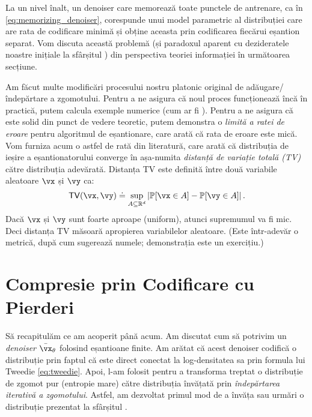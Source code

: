 \documentclass[../../book-main_ro.tex]{subfiles}
\begin{document}
\begin{remark}
	La un nivel înalt, un denoiser care memorează toate punctele de antrenare, ca în \eqref{eq:memorizing_denoiser}, corespunde unui model parametric al distribuției care are rata de codificare minimă și obține aceasta prin codificarea fiecărui eșantion separat. Vom discuta această problemă (și paradoxul aparent cu dezideratele noastre inițiale la sfârșitul ) din perspectiva teoriei informației în următoarea secțiune.
\end{remark}

Am făcut multe modificări procesului nostru platonic original de adăugare/îndepărtare a zgomotului. Pentru a ne asigura că noul proces funcționează încă în practică, putem calcula exemple numerice (cum ar fi ). Pentru a ne asigura că este solid din punct de vedere teoretic, putem demonstra o \textit{limită a ratei de eroare} pentru algoritmul de eșantionare, care arată că rata de eroare este mică. Vom furniza acum o astfel de rată din literatură, care arată că distribuția de ieșire a eșantionatorului converge în așa-numita \textit{distanță de variație totală (TV)} către distribuția adevărată. Distanța TV este definită între două variabile aleatoare \(\vx\) și \(\vy\) ca:
\begin{equation}
	\TV(\vx, \vy) \doteq \sup_{A \subseteq \R^{d}}\abs*{\Pr[\vx \in A] - \Pr[\vy \in A]}.
\end{equation}
Dacă \(\vx\) și \(\vy\) sunt foarte aproape (uniform), atunci supremumul va fi mic. Deci distanța TV măsoară apropierea variabilelor aleatoare. (Este într-adevăr o metrică, după cum sugerează numele; demonstrația este un exercițiu.)

\section{Compresie prin Codificare cu Pierderi} \label{sec:lossy_compression}

Să recapitulăm ce am acoperit până acum. Am discutat cum să potrivim un \textit{denoiser} \(\bar{\vx}_{\theta}\) folosind eșantioane finite. Am arătat că acest denoiser codifică o distribuție prin faptul că este direct conectat la log-densitatea sa prin formula lui Tweedie \eqref{eq:tweedie}. Apoi, l-am folosit pentru a transforma treptat o distribuție de zgomot pur (entropie mare) către distribuția învățată prin \textit{îndepărtarea iterativă a zgomotului}. Astfel, am dezvoltat primul mod de a învăța sau urmări o distribuție prezentat la sfârșitul .
\end{document}
